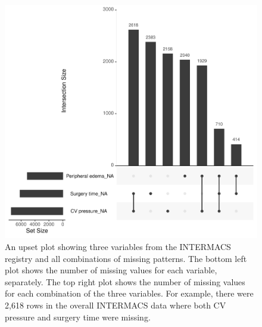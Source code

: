 \documentclass{article}
\begin{document}
\begin{figure}

{\centering \includegraphics{doc_arxiv_files/figure-latex/upset-1} 

}

\caption{An upset plot showing three variables from the INTERMACS registry and all combinations of missing patterns. The bottom left plot shows the number of missing values for each variable, separately. The top right plot shows the number of missing values for each combination of the three variables. For example, there were 2,618 rows in the overall INTERMACS data where both CV pressure and surgery time were missing.}\label{fig:upset}
\end{figure}

\clearpage
\end{document}
